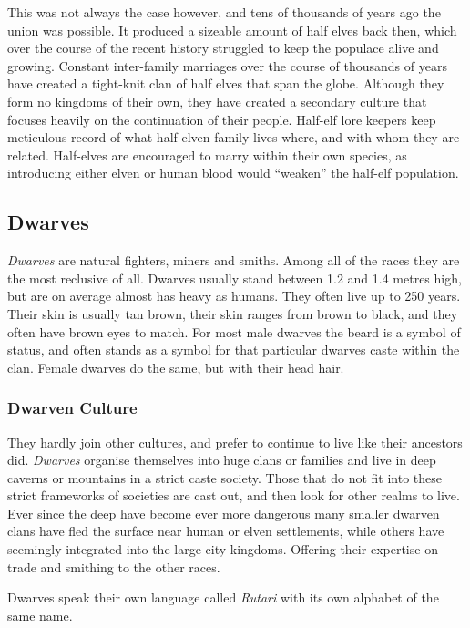 This was not always the case however, and tens of thousands of years ago the
union was possible. It produced a sizeable amount of half elves back then,
which over the course of the recent history struggled to keep the populace
alive and growing. Constant inter-family marriages over the course of
thousands of years have created a tight-knit clan of half elves that span the
globe. Although they form no kingdoms of their own, they have created a
secondary culture that focuses heavily on the continuation of their
people. Half-elf lore keepers keep meticulous record of what half-elven family
lives where, and with whom they are related. Half-elves are encouraged to
marry within their own species, as introducing either elven or human blood
would ``weaken'' the half-elf population.

\subsection*{Dwarves}

\emph{Dwarves} are natural fighters, miners and smiths. Among all of the races
they are the most reclusive of all. Dwarves usually stand between 1.2 and 1.4
metres high, but are on average almost has heavy as humans. They often live
up to 250 years. Their skin is usually tan brown, their skin ranges from brown
to black, and they often have brown eyes to match. For most male dwarves the
beard is a symbol of status, and often stands as a symbol for that particular
dwarves caste within the clan.  Female dwarves do the same, but with their
head hair.

\subsubsection*{Dwarven Culture}

They hardly join other cultures, and prefer to continue to live like their
ancestors did. \emph{Dwarves} organise themselves into huge clans or families
and live in deep caverns or mountains in a strict caste society. Those that do
not fit into these strict frameworks of societies are cast out, and then look
for other realms to live. Ever since the deep have become ever more dangerous
many smaller dwarven clans have fled the surface near human or elven
settlements, while others have seemingly integrated into the large city
kingdoms. Offering their expertise on trade and smithing to the other races.

Dwarves speak their own language called \emph{Rutari} with its own alphabet of
the same name.


